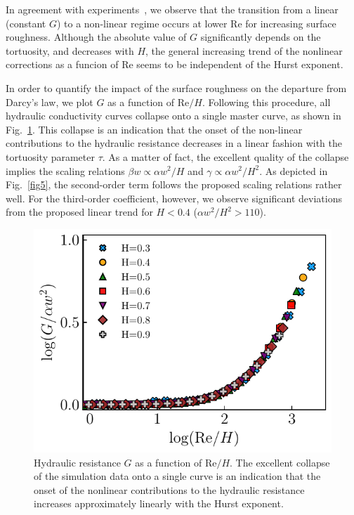 \documentclass[aps,pre,
superscriptaddress,
twocolumn,
notitlepage,
10pt,]{revtex4-1}
\begin{document}
In agreement with experiments~\cite{Chen2017a}, we observe that the transition
from a linear (constant $G$) to a non-linear regime occurs at lower
$\mathrm{Re}$ for increasing surface roughness. Although the absolute value of
$G$ significantly depends on the tortuosity, and decreases with $H$, the general
increasing trend of the nonlinear corrections as a funcion of $\mathrm{Re}$
seems to be independent of the Hurst exponent.

In order to quantify the impact of the surface roughness on the departure from
Darcy's law, we plot $G$  as a function of $ \mathrm{Re}/H $. Following this
procedure, all hydraulic conductivity curves collapse onto a single master
curve, as shown in Fig.~\ref{fig4}. This collapse is an indication that the
onset of the non-linear contributions to the hydraulic resistance decreases in a
linear fashion with the tortuosity parameter $\tau$. As a matter of fact, the
excellent quality of the collapse implies the scaling relations $ \beta w
\propto \alpha w^2/H $ and $ \gamma \propto \alpha w^2/H^2 $. As depicted in
Fig.~\ref{fig5}, the second-order term follows the proposed scaling
relations rather well. For the third-order coefficient, however, we observe significant deviations
from the proposed linear trend for $H<0.4$ ($\alpha w^2/H^2 > 110$).
\begin{figure} [!h] %
	\centering %
	\includegraphics[width=0.99\columnwidth]{fig4.pdf} \caption{Hydraulic
		resistance
		$G$ as a function of $\mathrm{Re}/H$. The excellent collapse of the
		simulation
		data onto a single curve is an indication that the onset of the nonlinear
		contributions to the hydraulic resistance increases approximately linearly
		with
		the Hurst exponent.} \label{fig4} %
\end{figure} %
\end{document}
